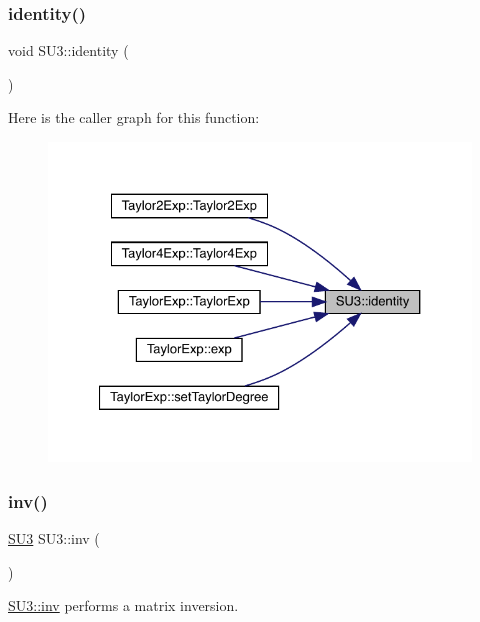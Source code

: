 \subsubsection{\texorpdfstring{identity()}{identity()}}
{\footnotesize\ttfamily void S\+U3\+::identity (\begin{DoxyParamCaption}{ }\end{DoxyParamCaption})}

Here is the caller graph for this function\+:\nopagebreak
\begin{figure}[H]
\begin{center}
\leavevmode
\includegraphics[width=327pt]{class_s_u3_af84aef1d34a4fdcda292200804eb1221_icgraph}
\end{center}
\end{figure}
\mbox{\label{class_s_u3_ad0e19706d3c6fdb50dcf788d4b48eb4c}} 
\subsubsection{\texorpdfstring{inv()}{inv()}}
{\footnotesize\ttfamily \mbox{\hyperlink{class_s_u3}{S\+U3}} S\+U3\+::inv (\begin{DoxyParamCaption}{ }\end{DoxyParamCaption})\hspace{0.3cm}{\ttfamily [inline]}}



\mbox{\hyperlink{class_s_u3_ad0e19706d3c6fdb50dcf788d4b48eb4c}{S\+U3\+::inv}} performs a matrix inversion. 


